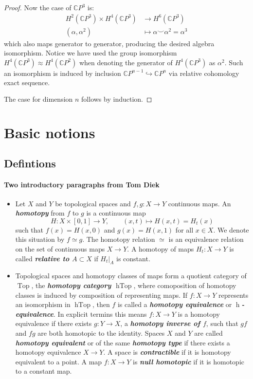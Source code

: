 \begin{proof}
	Now the case of $\mathbb{C} P^3$ is:
	\begin{align*}
		H^2(\mathbb{C} P^3)\times H^4(\mathbb{C} P^3)&\to H^6(\mathbb{C} P^3)\\
		(\alpha,\alpha^2)\qquad\quad&\mapsto\alpha\smile\alpha^2=\alpha^3
	\end{align*}
	which also  maps generator to generator, producing the desired algebra isomorphism. Notice we have used the group isomorphism $H^4(\mathbb{C} P^3)\approx H^4(\mathbb{C} P^2)$ when denoting the generator of $H^4(\mathbb{C} P^3)$ as $\alpha^2$. Such an isomorphism is induced by inclusion $\mathbb{C} P^{n-1}\hookrightarrow\mathbb{C} P^n$ via relative cohomology exact sequence.
	
	The case for dimension $n$ follows by induction.
\end{proof}

\section{Basic notions}\label{sec:Basic notions}
\subsection*{Defintions}
\paragraph{Two introductory paragraphs from Tom Diek}
\begin{itemize}
	\item Let $X$ and $Y$ be topological spaces and $f,g:X\to Y$ continuous maps. An \textbf{\textit{homotopy}} from $f$ to $g$ is a continuous map
		\[H:X\times[0,1]\to Y,\qquad(x,t)\mapsto H(x,t)=H_t(x)\]
		such that $f(x)=H(x,0)$ and $g(x)=H(x,1)$ for all $x\in X$. We denote this situation by $f\simeq g$. The homotopy relation $\simeq$ is an equivalence relation on the set of continuous maps $X\to Y$. A homotopy of maps $H_t:X\to Y$ is called \textbf{\textit{relative to $A\subset X$}} if $H_t|_A$ is constant.
		
		\item Topological spaces and homotopy classes of maps form a quotient category of $\operatorname{Top}$, the \textbf{\textit{homotopy category $\operatorname{hTop}$}}, where comoposition of homotopy classes is induced by composition of representing maps. If $f:X\to Y$ represents an isomorphism in $\operatorname{hTop}$, then $f$ is called a \textbf{\textit{homotopy equivalence}} or \textbf{\textit{$\operatorname{h}$-equivalence}}. In explicit termins this means $f:X\to Y$ is a homotopy equivalence if there exists $g:Y\to X$, a \textbf{\textit{homotopy inverse of $f$}}, such that $gf$ and $fg$ are both homotopic to the identity. Spaces $X$ and $Y$ are called \textbf{\textit{homotopy equivalent}} or of the same \textbf{\textit{homotopy type}} if there exists a homotopy equivalence $X\to Y$. A space is \textbf{\textit{contractible}} if it is homotopy equivalent to a point. A map $f:X\to Y$ is \textbf{\textit{null homotopic}} if it is homotopic to a constant map.
\end{itemize}

